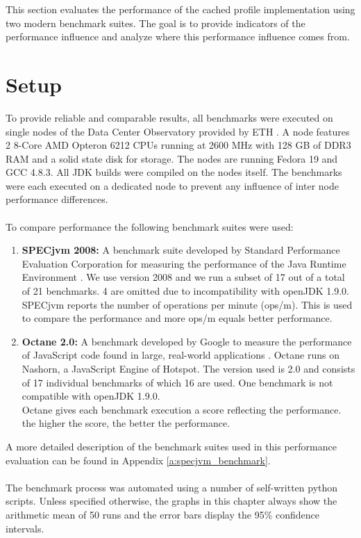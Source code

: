 This section evaluates the performance of the cached profile implementation using two modern benchmark suites. The goal is to provide indicators of the performance influence and analyze where this performance influence comes from.
\section{Setup}
\label{s:perf_setup}
To provide reliable and comparable results, all benchmarks were executed on single nodes of the Data Center Observatory provided by ETH \cite{ethdco}.
A node features 2 8-Core AMD Opteron 6212 CPUs running at 2600 MHz with 128 GB of DDR3 RAM and a solid state disk for storage.
The nodes are running Fedora 19 and GCC 4.8.3. All JDK builds were compiled on the nodes itself. The benchmarks were each executed on a dedicated node to prevent any influence of inter node performance differences.
\\\\
To compare performance the following benchmark suites were used:
\begin{enumerate}
  \item \textbf{SPECjvm 2008:} A benchmark suite developed by Standard Performance Evaluation Corporation for measuring the performance of the Java Runtime Environment \cite{specjvm}.  We use version 2008 and we run a subset of 17 out of a total of 21 benchmarks. 4 are omitted due to incompatibility with openJDK 1.9.0.
  \\
  SPECjvm reports the number of operations per minute (ops/m). This is used to compare the performance and more ops/m equals better performance.
  \item \textbf{Octane 2.0:} A benchmark developed by Google to measure the performance of JavaScript code found in large, real-world applications \cite{octane}. Octane runs on Nashorn, a JavaScript Engine of Hotspot. The version used is 2.0 and consists of 17 individual benchmarks of which 16 are used. One benchmark is not compatible with openJDK 1.9.0. 
  \\
  Octane gives each benchmark execution a score reflecting the performance. the higher the score, the better the performance.
\end{enumerate}
A more detailed description of the benchmark suites used in this performance evaluation can be found in Appendix \ref{a:specjvm_benchmark}.
\\\\
The benchmark process was automated using a number of self-written python scripts. Unless specified otherwise, the graphs in this chapter always show the arithmetic mean of 50 runs and the error bars display the 95\% confidence intervals.

